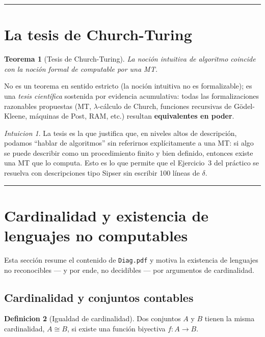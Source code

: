 \documentclass[11pt,a4paper]{article}
\theoremstyle{plain}
\newtheorem{teorema}{Teorema}[section]
\theoremstyle{definition}
\newtheorem{definicion}[teorema]{Definicion}
\theoremstyle{remark}
\newtheorem*{intuicion}{Intuicion}
\begin{document}
\bigskip\hrule\bigskip

\section{La tesis de Church-Turing}
\label{sec:church-turing}

\begin{teorema}[Tesis de Church-Turing]
La noci\'on intuitiva de \emph{algoritmo} coincide con la noci\'on formal
de \emph{computable por una MT}.
\end{teorema}

No es un teorema en sentido estricto (la noci\'on intuitiva no es
formalizable); es una \emph{tesis cient\'ifica} sostenida por evidencia
acumulativa: todas las formalizaciones razonables propuestas (MT,
$\lambda$-c\'alculo de Church, funciones recursivas de G\"odel-Kleene,
m\'aquinas de Post, RAM, etc.) resultan \textbf{equivalentes en poder}.

\begin{intuicion}
La tesis es la que justifica que, en niveles altos de descripci\'on, podamos
``hablar de algoritmos'' sin referirnos expl\'icitamente a una MT: si algo
se puede describir como un procedimiento finito y bien definido, entonces
existe una MT que lo computa. Esto es lo que permite que el Ejercicio~3 del
pr\'actico se resuelva con descripciones tipo Sipser sin escribir 100
l\'ineas de $\delta$.
\end{intuicion}

\bigskip\hrule\bigskip

\section{Cardinalidad y existencia de lenguajes no computables}
\label{sec:cardinalidad}

Esta secci\'on resume el contenido de \texttt{Diag.pdf} y motiva la
existencia de lenguajes no reconocibles --- y por ende, no decidibles --- por
argumentos de cardinalidad.

\subsection{Cardinalidad y conjuntos contables}

\begin{definicion}[Igualdad de cardinalidad]
Dos conjuntos $A$ y $B$ tienen la misma cardinalidad, $A\cong B$, si existe
una funci\'on biyectiva $f:A\to B$.
\end{definicion}
\end{document}
